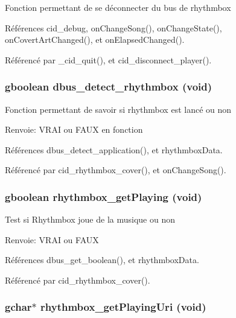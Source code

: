 Fonction permettant de se déconnecter du bus de rhythmbox 

Références cid\_\-debug, onChangeSong(), onChangeState(), onCovertArtChanged(), et onElapsedChanged().

Référencé par \_\-cid\_\-quit(), et cid\_\-disconnect\_\-player().
\subsubsection{\setlength{\rightskip}{0pt plus 5cm}gboolean dbus\_\-detect\_\-rhythmbox (void)}\label{cid-rhythmbox_8c_4e78689f45b1124c082f3f8d1d99381b}


Fonction permettant de savoir si rhythmbox est lancé ou non \begin{Desc}
\item[Renvoie:]VRAI ou FAUX en fonction \end{Desc}


Références dbus\_\-detect\_\-application(), et rhythmboxData.

Référencé par cid\_\-rhythmbox\_\-cover(), et onChangeSong().
\subsubsection{\setlength{\rightskip}{0pt plus 5cm}gboolean rhythmbox\_\-getPlaying (void)}\label{cid-rhythmbox_8c_37c074644bce2e4ed6f1a31c1eac95bb}


Test si Rhythmbox joue de la musique ou non \begin{Desc}
\item[Renvoie:]VRAI ou FAUX \end{Desc}


Références dbus\_\-get\_\-boolean(), et rhythmboxData.

Référencé par cid\_\-rhythmbox\_\-cover().
\subsubsection{\setlength{\rightskip}{0pt plus 5cm}gchar$\ast$ rhythmbox\_\-getPlayingUri (void)}\label{cid-rhythmbox_8c_499eaab9290271017f4ce7526c1873fc}


